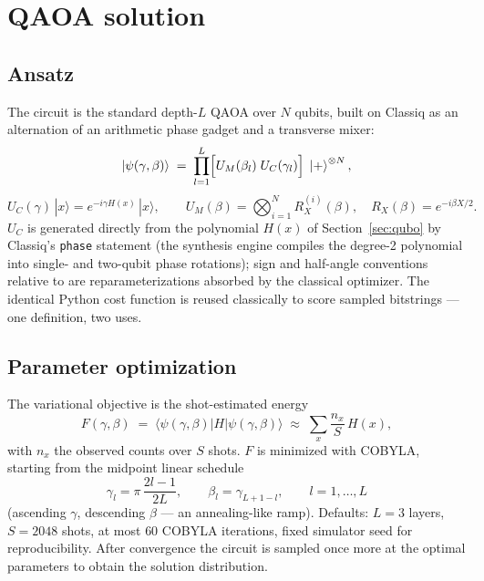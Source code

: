 \documentclass[11pt]{article}
\begin{document}
\section{QAOA solution}
\label{sec:qaoa}

\subsection{Ansatz}

The circuit is the standard depth-$L$ QAOA \cite{farhi2014} over $N$ qubits,
built on Classiq as an alternation of an arithmetic phase gadget and a
transverse mixer:
\begin{equation}
  \label{eq:ansatz}
  \left| \psi(\gamma, \beta) \right\rangle
  \;=\;
  \prod_{l=1}^{L} \Bigl[ U_M(\beta_l)\; U_C(\gamma_l) \Bigr]\;
  \left| + \right\rangle^{\otimes N},
\end{equation}
\begin{equation}
  U_C(\gamma)\,|x\rangle = e^{-i \gamma H(x)}\,|x\rangle,
  \qquad
  U_M(\beta) = \bigotimes_{i=1}^{N} R_X^{(i)}(\beta),
  \quad R_X(\beta) = e^{-i \beta X / 2}.
\end{equation}
$U_C$ is generated directly from the polynomial $H(x)$ of
Section~\ref{sec:qubo} by Classiq's \texttt{phase} statement (the synthesis
engine compiles the degree-2 polynomial into single- and two-qubit phase
rotations); sign and half-angle conventions relative to \cite{farhi2014} are
reparameterizations absorbed by the classical optimizer. The identical Python
cost function is reused classically to score sampled bitstrings --- one
definition, two uses.

\subsection{Parameter optimization}

The variational objective is the shot-estimated energy
\begin{equation}
  F(\gamma, \beta) \;=\;
  \bigl\langle \psi(\gamma,\beta) \bigr| H \bigl| \psi(\gamma,\beta) \bigr\rangle
  \;\approx\; \sum_{x} \frac{n_x}{S}\, H(x),
\end{equation}
with $n_x$ the observed counts over $S$ shots. $F$ is minimized with COBYLA,
starting from the midpoint linear schedule
\begin{equation}
  \gamma_l = \pi\,\frac{2l-1}{2L}, \qquad
  \beta_l = \gamma_{L+1-l}, \qquad l = 1,\dots,L
\end{equation}
(ascending $\gamma$, descending $\beta$ --- an annealing-like ramp). Defaults:
$L = 3$ layers, $S = 2048$ shots, at most $60$ COBYLA iterations, fixed
simulator seed for reproducibility. After convergence the circuit is sampled
once more at the optimal parameters to obtain the solution distribution.
\end{document}
